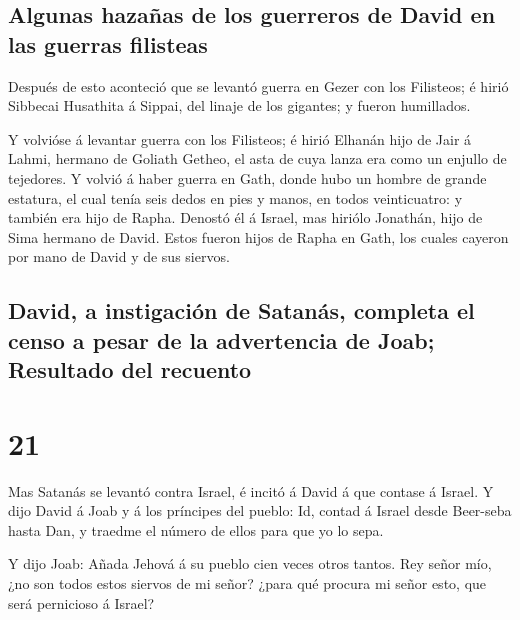 \hypertarget{algunas-hazauxf1as-de-los-guerreros-de-david-en-las-guerras-filisteas}{%
\subsection{Algunas hazañas de los guerreros de David en las guerras
filisteas}\label{algunas-hazauxf1as-de-los-guerreros-de-david-en-las-guerras-filisteas}}

 Después de esto aconteció que se levantó guerra en Gezer
con los Filisteos; é hirió Sibbecai Husathita á Sippai, del linaje de
los gigantes; y fueron humillados.

 Y volvióse á levantar guerra con los Filisteos; é hirió
Elhanán hijo de Jair á Lahmi, hermano de Goliath Getheo, el asta de cuya
lanza era como un enjullo de tejedores.  Y volvió á haber
guerra en Gath, donde hubo un hombre de grande estatura, el cual tenía
seis dedos en pies y manos, en todos veinticuatro: y también era hijo de
Rapha.  Denostó él á Israel, mas hiriólo Jonathán, hijo de
Sima hermano de David.  Estos fueron hijos de Rapha en
Gath, los cuales cayeron por mano de David y de sus siervos.

\hypertarget{david-a-instigaciuxf3n-de-satanuxe1s-completa-el-censo-a-pesar-de-la-advertencia-de-joab-resultado-del-recuento}{%
\subsection{David, a instigación de Satanás, completa el censo a pesar
de la advertencia de Joab; Resultado del
recuento}\label{david-a-instigaciuxf3n-de-satanuxe1s-completa-el-censo-a-pesar-de-la-advertencia-de-joab-resultado-del-recuento}}

\hypertarget{section-13-21}{%
\section{21}\label{section-13-21}}

 Mas Satanás se levantó contra Israel, é incitó á David á
que contase á Israel.  Y dijo David á Joab y á los
príncipes del pueblo: Id, contad á Israel desde Beer-seba hasta Dan, y
traedme el número de ellos para que yo lo sepa.

 Y dijo Joab: Añada Jehová á su pueblo cien veces otros
tantos. Rey señor mío, ¿no son todos estos siervos de mi señor? ¿para
qué procura mi señor esto, que será pernicioso á Israel?

